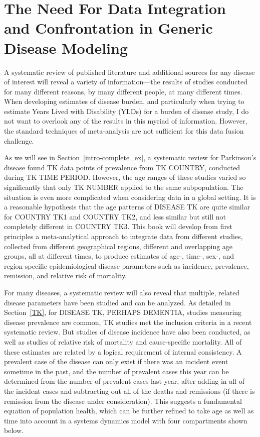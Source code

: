 \section[Need for Confrontation]{The Need For Data Integration and Confrontation in Generic Disease Modeling}

A systematic review of published literature and additional sources for
any disease of interest will reveal a variety of information---the
results of studies conducted for many different reasons, by many
different people, at many different times. When developing estimates
of disease burden, and particularly when trying to estimate Years
Lived with Disability (YLDs) for a burden of disease study, I do not
want to overlook any of the results in this myriad of
information. However, the standard techniques of meta-analysis are
not sufficient for this data fusion challenge.

As we will see in Section~\ref{intro-complete_ex}, a systematic review for Parkinson's disease found TK data points of prevalence from TK COUNTRY,
conducted during TK TIME PERIOD.  However, the age ranges of these
studies varied so significantly that only TK NUMBER applied to the
same subpopulation.  The situation is even more complicated when
considering data in a global setting. It is a reasonable hypothesis
that the age patterns of DISEASE TK are quite similar for COUNTRY TK1
and COUNTRY TK2, and less similar but still not completely different
in COUNTRY TK3. This book will develop from first principles a
meta-analytical approach to integrate data from different studies,
collected from different geographical regions, different and
overlapping age groups, all at different times, to produce estimates
of age-, time-, sex-, and region-specific epidemiological disease
parameters such as incidence, prevalence, remission, and relative risk
of mortality.

For many diseases, a systematic review will also reveal that multiple,
related disease parameters have been studied and can be analyzed. As
detailed in Section~\ref{TK}, for DISEASE TK, PERHAPS DEMENTIA,
studies measuring disease prevalence are common, TK studies met the
inclusion criteria in a recent systematic review. But studies of
disease incidence have also been conducted, as well as studies of
relative risk of mortality and cause-specific mortality. All of these
estimates are related by a logical requirement of internal
consistency.  A prevalent case of the disease can only exist if there
was an incident event sometime in the past, and the number of
prevalent cases this year can be determined from the number of
prevalent cases last year, after adding in all of the incident cases
and subtracting out all of the deaths and remissions (if there is
remission from the disease under consideration).  This suggests a
fundamental equation of population health, which can be further
refined to take age as well as time into account in a systems dynamics
model with four compartments shown below.

